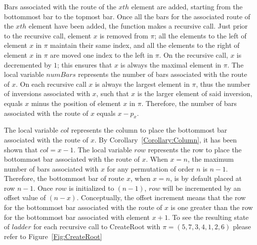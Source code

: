 Bars associated with the route of the $xth$ element are added, starting 
from the bottommost bar to the topmost bar. Once all the bars 
for the associated route of the $xth$ element have been added, the function makes a recursive call. Just prior to the recursive 
call, element $x$ is removed from $\pi$; all the elements to the left of element $x$ in $\pi$ 
maintain their same index, and all the elements to the right of element $x$ in $\pi$ are moved one index to the left in $\pi$. 
On the recursive call, $x$ is decremented by $1$; this ensures that $x$ is always the maximal element in $\pi$. 
The local variable $numBars$ 
represents the number of bars associated with the route of $x$. On each recursive call $x$ is always the largest element in $\pi$, 
thus the number of 
inversions associated with $x$, such that $x$ is the larger element of said inversion, equals 
$x$ minus the position of element $x$ in $\pi$. Therefore, the number of bars associated with the route of $x$ equals $x-p_{x}$.\par 
The local variable $col$ represents the column to place the bottommost bar associated with 
the route of $x$. By Corollary~\ref{Corollary:Column}, it has been shown that $col=x-1$. The local variable $row$ represents 
the row to place the bottommost bar associated with the route of $x$. When $x=n$, the maximum number of 
bars associated with $x$ for any permutation of order $n$ is $n-1$. 
Therefore, the bottommost bar of route $x$, when $x=n$, is by default placed at row $n-1$. 
Once $row$ is initialized to $(n-1)$, $row$ will be incremented by an offset value of $(n-x)$. Conceptually, the offset increment means that the row for the bottommost bar associated with the route of $x$ is one 
greater than the row for the bottommost bar associated with element $x+1$.  
To see the resulting state of $ladder$ for each recursive call to {\sc CreateRoot} with $\pi=(5,7,3,4,1,2,6)$ please refer to Figure~\ref{Fig:CreateRoot}\pagebreak


